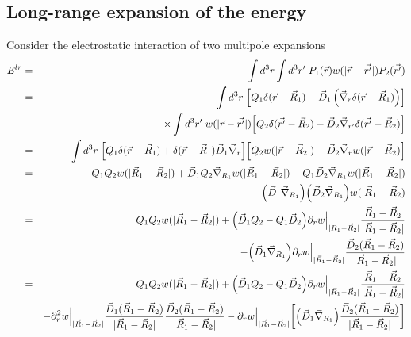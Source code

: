 \documentclass[11pt,a4paper]{report}
\begin{document}
\subsection{Long-range expansion of the energy}
Consider the electrostatic interaction of two multipole expansions
\begin{eqnarray}
E^{lr}
&=&\int d^3r\int d^3r'\;P_1(\vec{r})w(|\vec{r}-\vec{r'}|)P_2(\vec{r'})
\nonumber\\
%
%
%
&=&\int d^3r\;
\Bigl[
Q_1\delta(\vec{r}-\vec{R}_1)
-\vec{D}_1\left(\vec{\nabla}_r\delta(\vec{r}-\vec{R}_1)\right)
\Bigr]
\nonumber\\
&&\hspace{1cm}\times
\int d^3r'\;w(|\vec{r}-\vec{r'}|)
\Bigl[
Q_2\delta(\vec{r'}-\vec{R}_2)
-\vec{D}_2\vec{\nabla}_{r'}\delta(\vec{r'}-\vec{R}_2)
\Bigr]
\nonumber\\
%
%
%
&=&\int d^3r\;
\Bigl[
Q_1\delta(\vec{r}-\vec{R}_1)
+\delta(\vec{r}-\vec{R}_1)\vec{D}_1\vec{\nabla}_r
\Bigr]
\Bigl[
Q_2w(|\vec{r}-\vec{R}_2|)
-\vec{D}_2\vec{\nabla}_{r}w(|\vec{r}-\vec{R}_2)
\Bigr]
\nonumber\\
%
%
%
&=&
Q_1Q_2w(|\vec{R}_1-\vec{R}_2|)
+\vec{D}_1Q_2\vec{\nabla}_{R_1}w(|\vec{R}_1-\vec{R}_2|)
-Q_1\vec{D}_2\vec{\nabla}_{R_1}w(|\vec{R}_1-\vec{R}_2|)
\nonumber\\
&&-\Bigl(\vec{D}_1\vec{\nabla}_{R_1}\Bigr)
\Bigl(\vec{D}_2\vec{\nabla}_{R_1}\Bigr)w(|\vec{R}_1-\vec{R}_2)
\nonumber\\
%
%
%
&=&
Q_1Q_2w(|\vec{R}_1-\vec{R}_2|)
+\Bigl(\vec{D}_1Q_2-Q_1\vec{D}_2\Bigr)
\Bigl.\partial_rw\Bigr|_{|\vec{R}_1-\vec{R}_2|}
\frac{\vec{R}_1-\vec{R}_2}{|\vec{R}_1-\vec{R}_2|}
\nonumber\\
&&-\Bigl(\vec{D}_1\vec{\nabla}_{R_1}\Bigr)
\Bigl.\partial_rw\Bigr|_{|\vec{R}_1-\vec{R}_2|}
\frac{\vec{D}_2(\vec{R}_1-\vec{R}_2)}{|\vec{R}_1-\vec{R}_2|}
\nonumber\\
%
%
%
&=&
Q_1Q_2w(|\vec{R}_1-\vec{R}_2|)
+\Bigl(\vec{D}_1Q_2-Q_1\vec{D}_2\Bigr)
\Bigl.\partial_rw\Bigr|_{|\vec{R}_1-\vec{R}_2|}
\frac{\vec{R}_1-\vec{R}_2}{|\vec{R}_1-\vec{R}_2|}
\nonumber\\
&&
-\Bigl.\partial^2_rw\Bigr|_{|\vec{R}_1-\vec{R}_2|}
\frac{\vec{D}_1(\vec{R}_1-\vec{R}_2)}{|\vec{R}_1-\vec{R}_2|}
\frac{\vec{D}_2(\vec{R}_1-\vec{R}_2)}{|\vec{R}_1-\vec{R}_2|}
-
\Bigl.\partial_rw\Bigr|_{|\vec{R}_1-\vec{R}_2|}
\biggl[
\Bigl(\vec{D}_1\vec{\nabla}_{R_1}\Bigr)
\frac{\vec{D}_2(\vec{R}_1-\vec{R}_2)}{|\vec{R}_1-\vec{R}_2|}
\biggr]
\nonumber\\

\end{eqnarray}
\end{document}
